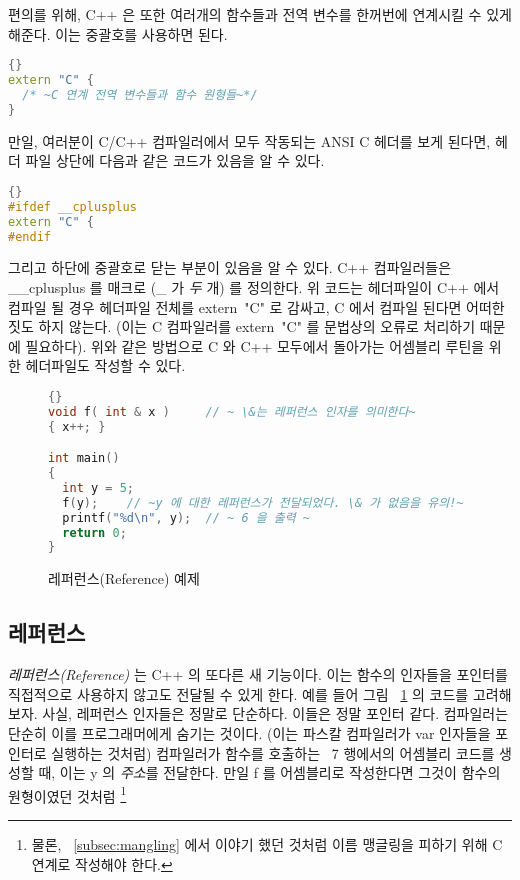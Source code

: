 편의를 위해, C++ 은 또한 여러개의 함수들과 전역 변수를 한꺼번에 연계시킬 수 있게 해준다.
이는 중괄호를 사용하면 된다. 

\begin{lstlisting}[stepnumber=0,language=C++,escapeinside=~~]{}
extern "C" {
  /* ~C 연계 전역 변수들과 함수 원형들~*/
}
\end{lstlisting}

만일, 여러분이 C/C++ 컴파일러에서 모두 작동되는 ANSI C 헤더를 보게 된다면,
헤더 파일 상단에 다음과 같은 코드가 있음을 알 수 있다.

\begin{lstlisting}[stepnumber=0,language=C++]{}
#ifdef __cplusplus
extern "C" {
#endif
\end{lstlisting}
\noindent 그리고 하단에 중괄호로 닫는 부분이 있음을 알 수 있다. 
C++ 컴파일러들은 {\code \_\_cplusplus} 를 매크로 (\_ 가 \emph{두}
개) 를 정의한다. 위 코드는 헤더파일이 C++ 에서 컴파일 될 경우 헤더파일
전체를 {\code extern~"C"} 로 감싸고, C 에서 컴파일 된다면 어떠한 짓도 하지
않는다. (이는 C 컴파일러를 {\code extern~"C"} 를 문법상의 오류로 
처리하기 때문에 필요하다). 위와 같은 방법으로 C 와 C++ 모두에서
돌아가는 어셈블리 루틴을 위한 헤더파일도 작성할 수 있다. 


\begin{figure}
\begin{lstlisting}[language=C++,frame=tlrb,escapeinside=~~]{}
void f( int & x )     // ~ \&는 레퍼런스 인자를 의미한다~
{ x++; }

int main()
{
  int y = 5;
  f(y);    // ~y 에 대한 레퍼런스가 전달되었다. \& 가 없음을 유의!~
  printf("%d\n", y);  // ~ 6 을 출력 ~
  return 0;
}
\end{lstlisting}
\caption{레퍼런스(Reference) 예제\label{fig:refex}}
\end{figure}

\subsection{레퍼런스}

\emph{레퍼런스(Reference)} 는 C++ 의 또다른 새 기능이다. 이는 함수의 인자들을
포인터를 직접적으로 사용하지 않고도 전달될 수 있게 한다. 예를 들어 그림 ~\ref{fig:refex} 의
코드를 고려해 보자. 사실, 레퍼런스 인자들은 정말로 단순하다. 이들은 정말 포인터 같다. 
컴파일러는 단순히 이를 프로그래머에게 숨기는 것이다. (이는 파스칼 컴파일러가 {\code var} 인자들을
포인터로 실행하는 것처럼) 컴파일러가 함수를 호출하는 ~7 행에서의 어셈블리 코드를 생성할 때,
이는 {\code y} 의 \emph{주소}를 전달한다. 만일 {\code f} 를 어셈블리로 작성한다면 그것이
함수의 원형이였던 것처럼 \footnote{물론, ~\ref{subsec:mangling} 에서 이야기 했던 것처럼 이름 맹글링을 피하기 위해
C 연계로 작성해야 한다. }

